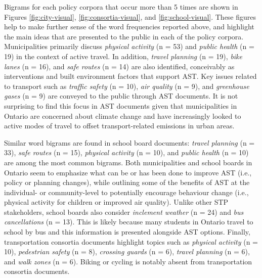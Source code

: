 \documentclass[]{elsarticle} %
\begin{document}
Bigrams for each policy corpora that occur more than 5 times are shown
in Figures \ref{fig:city-visual}, \ref{fig:consortia-visual}, and
\ref{fig:school-visual}. These figures help to make further sense of the
word frequencies reported above, and highlight the main ideas that are
presented to the public in each of the policy corpora. Municipalities
primarily discuss \emph{physical activity} (n = 53) and \emph{public
health} (n = 19) in the context of active travel. In addition,
\emph{travel planning} (n = 19), \emph{bike lanes} (n = 16), and
\emph{safe routes} (n = 14) are also identified, conceivably as
interventions and built environment factors that support AST. Key issues
related to transport such as \emph{traffic safety} (n = 10), \emph{air
quality} (n = 9), and \emph{greenhouse gases} (n = 9) are conveyed to
the public through AST documents. It is not surprising to find this
focus in AST documents given that municipalities in Ontario are
concerned about climate change and have increasingly looked to active
modes of travel to offset transport-related emissions in urban areas.

Similar word bigrams are found in school board documents: \emph{travel
planning} (n = 33), \emph{safe routes} (n = 15), \emph{physical
activity} (n = 10), and \emph{public health} (n = 10) are among the most
common bigrams. Both municipalities and school boards in Ontario seem to
emphasize what can be or has been done to improve AST (i.e., policy or
planning changes), while outlining some of the benefits of AST at the
individual- or community-level to potentially encourage behaviour change
(i.e., physical activity for children or improved air quality). Unlike
other STP stakeholders, school boards also consider \emph{inclement
weather} (n = 24) and \emph{bus cancellations} (n = 13). This is likely
because many students in Ontario travel to school by bus and this
information is presented alongside AST options. Finally, transportation
consortia documents highlight topics such as \emph{physical activity} (n
= 10), \emph{pedestrian safety} (n = 8), \emph{crossing guards} (n = 6),
\emph{travel planning} (n = 6), and \emph{walk zones} (n = 6). Biking or
cycling is notably absent from transportation consortia documents.
\end{document}
